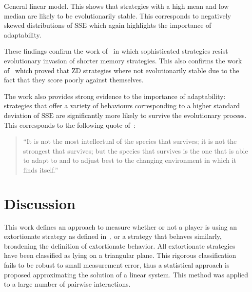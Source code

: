 \documentclass[a4paper]{article}
\newcommand{\SSe}{\text{SSE}}
\begin{document}
\begin{table}[!hbtp]
    \begin{center}
    \tiny
    
    \end{center}
    \caption{General linear model. This shows that strategies with a high mean
        and low median are likely to be evolutionarily stable. This corresponds
        to negatively skewed distributions of \(\SSe\) which again highlights
        the importance of adaptability.}
    \label{tbl:compare-fixation-to-sserror}
\end{table}

These findings confirm the work of~\cite{Moran1707} in which sophisticated
strategies resist evolutionary invasion of shorter memory strategies. This also
confirms the work of~\cite{adami2013evolutionary, hilbe2015partners} which
proved that ZD strategies where not evolutionarily stable due to the fact that
they score poorly against themselves.

The work also provides strong evidence to the importance of adaptability:
strategies that offer a variety of behaviours corresponding to a higher standard
deviation of \(\SSe\) are significantly more likely to survive the
evolutionary process. This corresponds to the following quote
of~\cite{darwin1869origin}:

\begin{quote}
``It is not the most intellectual of the species that survives; it is not the
strongest that survives; but the species that survives is the one that is able
to adapt to and to adjust best to the changing environment in which it finds
itself.''
\end{quote}

\section{Discussion}\label{sec:conclusion}

This work defines an approach to measure whether or not a player is using an
extortionate strategy as defined in~\cite{Press2012}, or a strategy that behaves
similarly, broadening the definition of extortionate behavior. All extortionate
strategies have been classified as lying on a triangular plane. This rigorous
classification fails to be robust to small measurement error, thus a statistical
approach is proposed approximating the solution of a linear system.
This method
was applied to a large number of pairwise interactions.
\end{document}
